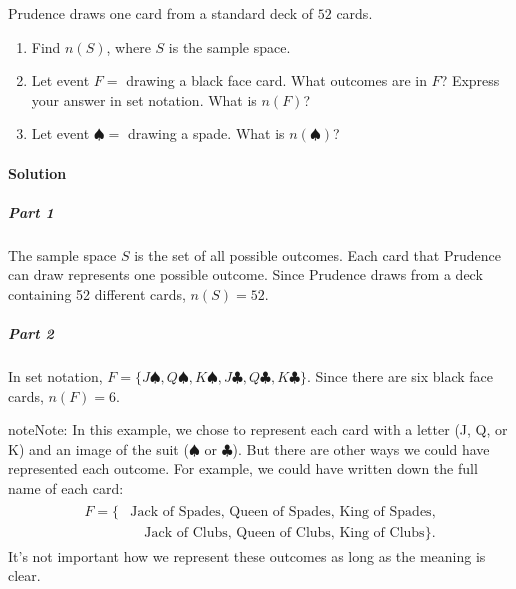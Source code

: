 \documentclass[letterpaper,10pt,english]{jupyterBook}
\begin{document}
\sphinxAtStartPar
Prudence draws one card from a standard deck of \(52\) cards.
\begin{enumerate}
%
\item {} 
\sphinxAtStartPar
Find \(n(S)\), where \(S\) is the sample space.

\item {} 
\sphinxAtStartPar
Let event \(F = \) drawing a black face card. What outcomes are in \(F\)? Express your answer in set notation. What is \(n(F)\)?

\item {} 
\sphinxAtStartPar
Let event \(♠ = \) drawing a spade. What is \(n(♠)\)?

\end{enumerate}


\paragraph{Solution}
\label{\detokenize{Ch3 Probability/3.1 Introduction to Probability:id3}}

\subparagraph{Part 1}
\label{\detokenize{Ch3 Probability/3.1 Introduction to Probability:id4}}
\sphinxAtStartPar
The sample space \(S\) is the set of all possible outcomes. Each card that Prudence can draw represents one possible outcome. Since Prudence draws from a deck containing 52 different cards, \(n(S) = 52\).


\subparagraph{Part 2}
\label{\detokenize{Ch3 Probability/3.1 Introduction to Probability:id5}}
\sphinxAtStartPar
In set notation, \(F = \{J♠, Q♠, K♠, J♣, Q♣, K♣\}\). Since there are six black face cards, \(n(F) = 6\).

\begin{sphinxadmonition}{note}{Note:}
\sphinxAtStartPar
In this example, we chose to represent each card with a letter (J, Q, or K) and an image of the suit (\(♠\) or \(♣\)). But there are other ways we could have represented each outcome. For example, we could have written down the full name of each card:
\begin{equation*}
\begin{split}\begin{aligned}
F = \{&\textrm{Jack of Spades, Queen of Spades, King of Spades,} \\
&\quad\textrm{Jack of Clubs, Queen of Clubs, King of Clubs}\}.
\end{aligned}\end{split}
\end{equation*}
\sphinxAtStartPar
It’s not important how we represent these outcomes as long as the meaning is clear.
\end{sphinxadmonition}
\end{document}
